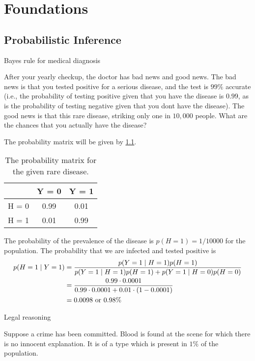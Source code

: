 \part{Foundations}

\chapter{Probabilistic Inference}

\begin{exercise}
\item Bayes rule for medical diagnosis
	\par\smallskip
	After your yearly checkup, the doctor has bad news and good news. The bad news is that you tested
	positive for a serious disease, and the test is \(99\%\) accurate (i.e., the probability of testing positive
	given that you have the disease is \(0.99\), as is the probability of testing negative given that you dont
	have the disease). The good news is that this rare disease, striking only one in \(10,000\) people.
	What are the chances that you actually have the disease?
	\par\smallskip
	The probability matrix will be given by \cref{ch2_ex1}.
	\begin{table}
	\centering
		\begin{tabular}{l | c c}
			& Y = 0 & Y = 1\\ \hline
			H = 0 & 0.99 & 0.01\\
			H = 1 & 0.01 & 0.99
		\end{tabular}
		\caption{The probability matrix for the given rare disease.}
		\label{ch2_ex1}
	\end{table}
	The probability of the prevalence of the disease is \(p(H = 1) = 1 / 10000\) for the population. The 
	probability that we are infected  and tested positive is
	\begin{align}
		p(H = 1\mid Y = 1) 
		&= \frac{p(Y = 1\mid H = 1) p(H = 1)}{p(Y = 1\mid H = 1) p(H = 1) + p(Y = 1\mid H = 0) p(H = 0)}
		\notag\\
		&= \frac{0.99\cdot 0.0001}{0.99\cdot 0.0001 + 0.01 \cdot (1 - 0.0001)}\notag\\
		&= 0.0098\text{ or } 0.98\%\notag
	\end{align}
\item Legal reasoning
	\par\smallskip
	Suppose a crime has been committed. Blood is found at the scene for which there is no innocent explanation.
	It is of a type which is present in \(1\%\) of the population.

\end{exercise}
